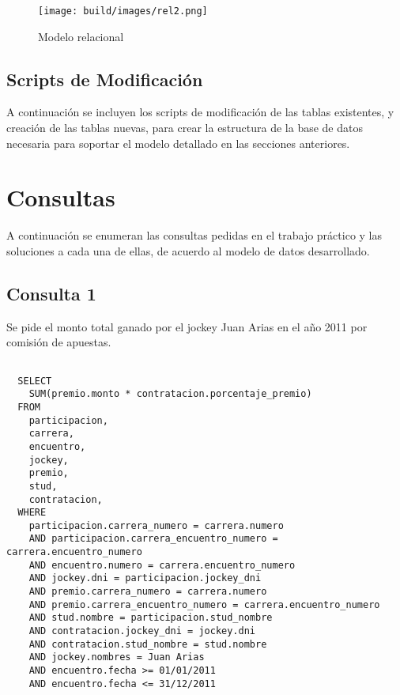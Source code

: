 \documentclass[a4paper,11pt]{article}
\begin{document}
\begin{figure}[h!t]
  \centering
  \texttt{[image: build/images/rel2.png]}
  \caption{Modelo relacional} \label{fig:rel2}
\end{figure}

\FloatBarrier

\subsection{Scripts de Modificación}

A continuación se incluyen los scripts de modificación de las tablas
existentes, y creación de las tablas nuevas, para crear la estructura de la
base de datos necesaria para soportar el modelo detallado en las secciones
anteriores.



\clearpage

\section{Consultas}

A continuación se enumeran las consultas pedidas en el trabajo práctico y las
soluciones a cada una de ellas, de acuerdo al modelo de datos desarrollado.

\subsection{Consulta 1}

Se pide el monto total ganado por el jockey Juan Arias en el año 2011 por
comisión de apuestas.

\begin{lstlisting}

  SELECT 
    SUM(premio.monto * contratacion.porcentaje_premio)
  FROM
    participacion,
    carrera,
    encuentro,
    jockey,
    premio,
    stud,
    contratacion,
  WHERE
    participacion.carrera_numero = carrera.numero
    AND participacion.carrera_encuentro_numero = carrera.encuentro_numero
    AND encuentro.numero = carrera.encuentro_numero
    AND jockey.dni = participacion.jockey_dni
    AND premio.carrera_numero = carrera.numero
    AND premio.carrera_encuentro_numero = carrera.encuentro_numero
    AND stud.nombre = participacion.stud_nombre
    AND contratacion.jockey_dni = jockey.dni
    AND contratacion.stud_nombre = stud.nombre
    AND jockey.nombres = Juan Arias
    AND encuentro.fecha >= 01/01/2011
    AND encuentro.fecha <= 31/12/2011

\end{lstlisting}
\end{document}
